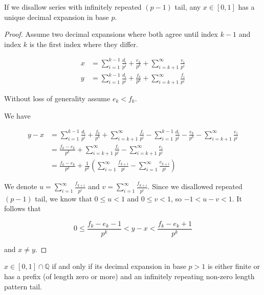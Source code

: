 \begin{thm}\label{while_a_decimal_expansion_three}
If we disallow series with infinitely repeated $(p-1)$ tail, any $x \in [0, 1]$ has a unique decimal expansion in base $p$.
\end{thm}

\begin{proof}
Assume two decimal expansions where both agree until index $k-1$ and index $k$ is the first index where they differ.

\begin{align*}
x &= \sum_{i = 1}^{k-1} \frac{d_i}{p^i} + \frac{e_k}{p^k} + \sum_{i = k + 1}^\infty \frac{e_i}{p^i} \\
y &= \sum_{i = 1}^{k-1} \frac{d_i}{p^i} + \frac{f_k}{p^k} + \sum_{i = k + 1}^\infty \frac{f_i}{p^i}
\end{align*}

Without loss of generality assume $e_k < f_k$. 

We have

\begin{align*}
y - x &= \sum_{i = 1}^{k-1} \frac{d_i}{p^i} + \frac{f_k}{p^k} + \sum_{i = k + 1}^\infty \frac{f_i}{p^i} - \sum_{i = 1}^{k-1} \frac{d_i}{p^i} - \frac{e_k}{p^k} - \sum_{i = k + 1}^\infty \frac{e_i}{p^i} \\
      &= \frac{f_k - e_k}{p^k} + \sum_{i = k + 1}^\infty \frac{f_i}{p^i} - \sum_{i = k + 1}^\infty \frac{e_i}{p^i} \\
      &= \frac{f_k - e_k}{p^k} + \frac{1}{p^k} (\sum_{i = 1}^\infty \frac{f_{k+i}}{p^i} - \sum_{i = 1}^\infty \frac{e_{k+i}}{p^i})
\end{align*}

We denote $u = \sum_{i = 1}^\infty \frac{f_{k+i}}{p^i}$ and $v = \sum_{i = 1}^\infty \frac{f_{k+i}}{p^i}$. Since we disallowed repeated $(p-1)$ tail, we know that $0 \leq u < 1$ and $0 \leq v < 1$, so $-1 < u - v < 1$. It follows that

$$
0 \leq \frac{f_k - e_k - 1}{p^k} < y - x < \frac{f_k - e_k + 1}{p^k}
$$

and $x \neq y$.
\end{proof}

\begin{thm}\label{while_a_decimal_expansion_four}
$x \in [0, 1] \cap \mathbb{Q}$ if and only if its decimal expansion in base $p > 1$ is either finite or has a prefix (of length zero or more) and an infinitely repeating non-zero length pattern tail.
\end{thm}

